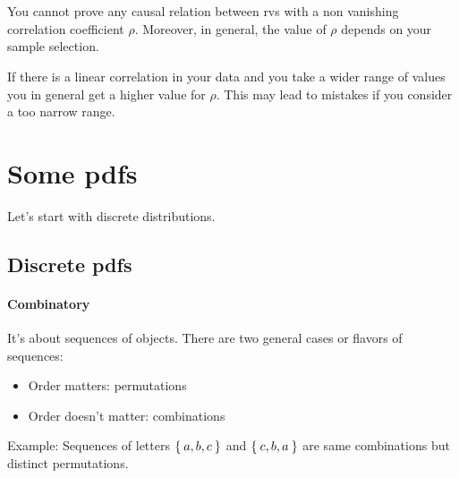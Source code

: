 \documentclass[
	10pt,
	draft
]{scrreprt}
\begin{document}
\section{}

You cannot prove any causal relation between \acp{rv} with a non vanishing correlation coefficient $\rho$.
Moreover, in general, the value of $\rho$ depends on your sample selection.

If there is a linear correlation in your data and you take a wider range of values you in general get a higher value for $\rho$.
This may lead to mistakes if you consider a too narrow range.

\section{Some \acsp{pdf}}

Let's start with discrete distributions.

	\subsection{Discrete \acsp{pdf}}

\paragraph{Combinatory}
It's about sequences of objects.
There are two general cases or flavors of sequences:
\begin{itemize}
	\item
Order matters: permutations
	\item
Order doesn't matter: combinations
\end{itemize}

Example: Sequences of letters $\Set{a,b,c}$ and $\Set{c,b,a}$ are same combinations but distinct permutations.
\end{document}
